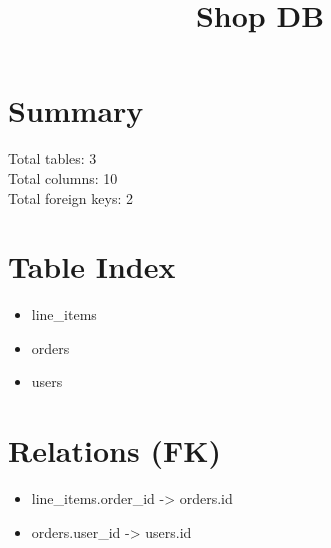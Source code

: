 \documentclass[11pt]{article}
\title{Shop DB}
\begin{document}
\maketitle
\section*{Summary}
Total tables: 3\\
Total columns: 10\\
Total foreign keys: 2

\section*{Table Index}
\begin{itemize}
  \item line\_items
  \item orders
  \item users
\end{itemize}

\section*{Relations (FK)}
\begin{itemize}
  \item line\_items.order\_id -> orders.id
  \item orders.user\_id -> users.id
\end{itemize}
\end{document}

